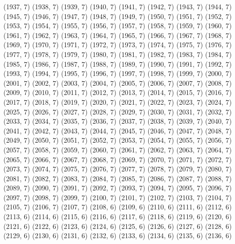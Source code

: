 {   (1937, 7)
   (1938, 7)
   (1939, 7)
   (1940, 7)
   (1941, 7)
   (1942, 7)
   (1943, 7)
   (1944, 7)
   (1945, 7)
   (1946, 7)
   (1947, 7)
   (1948, 7)
   (1949, 7)
   (1950, 7)
   (1951, 7)
   (1952, 7)
   (1953, 7)
   (1954, 7)
   (1955, 7)
   (1956, 7)
   (1957, 7)
   (1958, 7)
   (1959, 7)
   (1960, 7)
   (1961, 7)
   (1962, 7)
   (1963, 7)
   (1964, 7)
   (1965, 7)
   (1966, 7)
   (1967, 7)
   (1968, 7)
   (1969, 7)
   (1970, 7)
   (1971, 7)
   (1972, 7)
   (1973, 7)
   (1974, 7)
   (1975, 7)
   (1976, 7)
   (1977, 7)
   (1978, 7)
   (1979, 7)
   (1980, 7)
   (1981, 7)
   (1982, 7)
   (1983, 7)
   (1984, 7)
   (1985, 7)
   (1986, 7)
   (1987, 7)
   (1988, 7)
   (1989, 7)
   (1990, 7)
   (1991, 7)
   (1992, 7)
   (1993, 7)
   (1994, 7)
   (1995, 7)
   (1996, 7)
   (1997, 7)
   (1998, 7)
   (1999, 7)
   (2000, 7)
   (2001, 7)
   (2002, 7)
   (2003, 7)
   (2004, 7)
   (2005, 7)
   (2006, 7)
   (2007, 7)
   (2008, 7)
   (2009, 7)
   (2010, 7)
   (2011, 7)
   (2012, 7)
   (2013, 7)
   (2014, 7)
   (2015, 7)
   (2016, 7)
   (2017, 7)
   (2018, 7)
   (2019, 7)
   (2020, 7)
   (2021, 7)
   (2022, 7)
   (2023, 7)
   (2024, 7)
   (2025, 7)
   (2026, 7)
   (2027, 7)
   (2028, 7)
   (2029, 7)
   (2030, 7)
   (2031, 7)
   (2032, 7)
   (2033, 7)
   (2034, 7)
   (2035, 7)
   (2036, 7)
   (2037, 7)
   (2038, 7)
   (2039, 7)
   (2040, 7)
   (2041, 7)
   (2042, 7)
   (2043, 7)
   (2044, 7)
   (2045, 7)
   (2046, 7)
   (2047, 7)
   (2048, 7)
   (2049, 7)
   (2050, 7)
   (2051, 7)
   (2052, 7)
   (2053, 7)
   (2054, 7)
   (2055, 7)
   (2056, 7)
   (2057, 7)
   (2058, 7)
   (2059, 7)
   (2060, 7)
   (2061, 7)
   (2062, 7)
   (2063, 7)
   (2064, 7)
   (2065, 7)
   (2066, 7)
   (2067, 7)
   (2068, 7)
   (2069, 7)
   (2070, 7)
   (2071, 7)
   (2072, 7)
   (2073, 7)
   (2074, 7)
   (2075, 7)
   (2076, 7)
   (2077, 7)
   (2078, 7)
   (2079, 7)
   (2080, 7)
   (2081, 7)
   (2082, 7)
   (2083, 7)
   (2084, 7)
   (2085, 7)
   (2086, 7)
   (2087, 7)
   (2088, 7)
   (2089, 7)
   (2090, 7)
   (2091, 7)
   (2092, 7)
   (2093, 7)
   (2094, 7)
   (2095, 7)
   (2096, 7)
   (2097, 7)
   (2098, 7)
   (2099, 7)
   (2100, 7)
   (2101, 7)
   (2102, 7)
   (2103, 7)
   (2104, 7)
   (2105, 7)
   (2106, 7)
   (2107, 7)
   (2108, 6)
   (2109, 6)
   (2110, 6)
   (2111, 6)
   (2112, 6)
   (2113, 6)
   (2114, 6)
   (2115, 6)
   (2116, 6)
   (2117, 6)
   (2118, 6)
   (2119, 6)
   (2120, 6)
   (2121, 6)
   (2122, 6)
   (2123, 6)
   (2124, 6)
   (2125, 6)
   (2126, 6)
   (2127, 6)
   (2128, 6)
   (2129, 6)
   (2130, 6)
   (2131, 6)
   (2132, 6)
   (2133, 6)
   (2134, 6)
   (2135, 6)
   (2136, 6)
}
